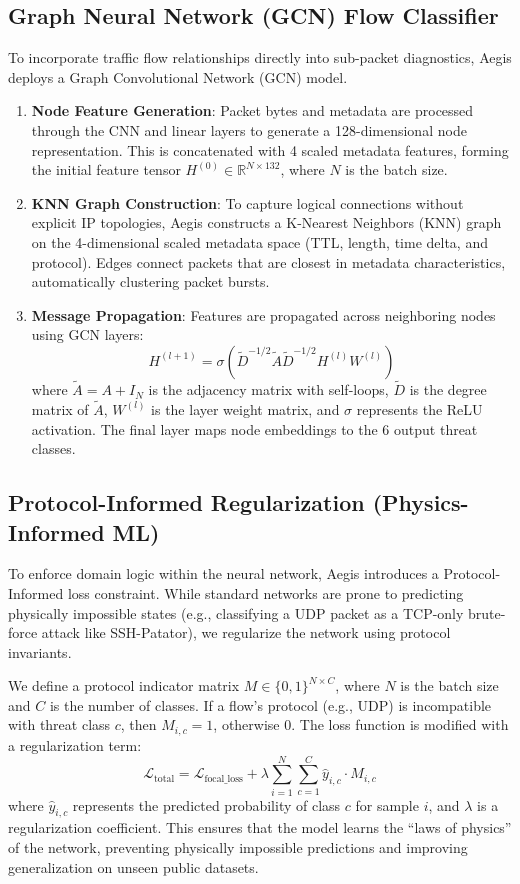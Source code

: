 \documentclass[journal,twoside]{IEEEtran}
\begin{document}
\subsection{Graph Neural Network (GCN) Flow Classifier}
To incorporate traffic flow relationships directly into sub-packet diagnostics, Aegis deploys a Graph Convolutional Network (GCN) model.
\begin{enumerate}
    \item \textbf{Node Feature Generation}: Packet bytes and metadata are processed through the CNN and linear layers to generate a 128-dimensional node representation. This is concatenated with 4 scaled metadata features, forming the initial feature tensor $H^{(0)} \in \mathbb{R}^{N \times 132}$, where $N$ is the batch size.
    \item \textbf{KNN Graph Construction}: To capture logical connections without explicit IP topologies, Aegis constructs a K-Nearest Neighbors (KNN) graph on the 4-dimensional scaled metadata space (TTL, length, time delta, and protocol). Edges connect packets that are closest in metadata characteristics, automatically clustering packet bursts.
    \item \textbf{Message Propagation}: Features are propagated across neighboring nodes using GCN layers:
    \begin{equation}
    H^{(l+1)} = \sigma \left( \tilde{D}^{-1/2} \tilde{A} \tilde{D}^{-1/2} H^{(l)} W^{(l)} \right)
    \end{equation}
    where $\tilde{A} = A + I_N$ is the adjacency matrix with self-loops, $\tilde{D}$ is the degree matrix of $\tilde{A}$, $W^{(l)}$ is the layer weight matrix, and $\sigma$ represents the ReLU activation. The final layer maps node embeddings to the 6 output threat classes.
\end{enumerate}

\subsection{Protocol-Informed Regularization (Physics-Informed ML)}
To enforce domain logic within the neural network, Aegis introduces a Protocol-Informed loss constraint. While standard networks are prone to predicting physically impossible states (e.g., classifying a UDP packet as a TCP-only brute-force attack like SSH-Patator), we regularize the network using protocol invariants. 

We define a protocol indicator matrix $M \in \{0, 1\}^{N \times C}$, where $N$ is the batch size and $C$ is the number of classes. If a flow's protocol (e.g., UDP) is incompatible with threat class $c$, then $M_{i,c} = 1$, otherwise $0$. The loss function is modified with a regularization term:
\begin{equation}
\mathcal{L}_{\text{total}} = \mathcal{L}_{\text{focal\_loss}} + \lambda \sum_{i=1}^{N} \sum_{c=1}^{C} \hat{y}_{i,c} \cdot M_{i,c}
\end{equation}
where $\hat{y}_{i,c}$ represents the predicted probability of class $c$ for sample $i$, and $\lambda$ is a regularization coefficient. This ensures that the model learns the ``laws of physics'' of the network, preventing physically impossible predictions and improving generalization on unseen public datasets.
\end{document}
